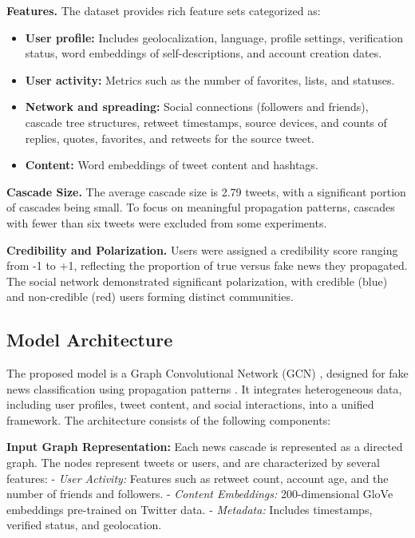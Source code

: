 \documentclass[sigconf,nonacm]{acmart}
\begin{document}
\textbf{Features.} The dataset provides rich feature sets categorized as: \begin{itemize} \item \textbf{User profile:} Includes geolocalization, language, profile settings, verification status, word embeddings of self-descriptions, and account creation dates. \item \textbf{User activity:} Metrics such as the number of favorites, lists, and statuses. \item \textbf{Network and spreading:} Social connections (followers and friends), cascade tree structures, retweet timestamps, source devices, and counts of replies, quotes, favorites, and retweets for the source tweet. \item \textbf{Content:} Word embeddings of tweet content and hashtags. \end{itemize}

\textbf{Cascade Size.} The average cascade size is 2.79 tweets, with a significant portion of cascades being small. To focus on meaningful propagation patterns, cascades with fewer than six tweets were excluded from some experiments.

\textbf{Credibility and Polarization.} Users were assigned a credibility score ranging from -1 to +1, reflecting the proportion of true versus fake news they propagated. The social network demonstrated significant polarization, with credible (blue) and non-credible (red) users forming distinct communities.
\subsection{Model Architecture}

The proposed model is a Graph Convolutional Network (GCN) , \cite{Defferrard2016CNNGraphs} designed for fake news classification using propagation patterns \cite{Kipf2017GCN}. It integrates heterogeneous data, including user profiles, tweet content, and social interactions, into a unified framework. The architecture consists of the following components:

\textbf{Input Graph Representation:}  
Each news cascade is represented as a directed graph. The nodes represent tweets or users, and are characterized by several features:
- \textit{User Activity:} Features such as retweet count, account age, and the number of friends and followers.
- \textit{Content Embeddings:} 200-dimensional GloVe embeddings pre-trained on Twitter data.
- \textit{Metadata:} Includes timestamps, verified status, and geolocation.
\end{document}
